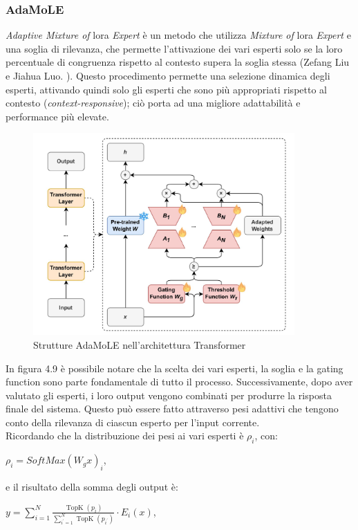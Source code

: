         \subsubsection{AdaMoLE}
        \textit{Adaptive Mixture of} \gls{lora} \textit{Expert} è un metodo che utilizza \textit{Mixture of} \gls{lora} \textit{Expert} e una soglia di rilevanza, che permette l’attivazione dei vari esperti solo se la loro percentuale di congruenza rispetto al contesto supera la soglia stessa (Zefang Liu e Jiahua Luo. \cite{article:Liu2024AdaMoLEFL}).
        Questo procedimento permette una selezione dinamica degli esperti, attivando quindi solo gli esperti che sono più appropriati rispetto al contesto (\textit{context-responsive}); ciò porta ad una migliore adattabilità e performance più elevate.
        \begin{figure}[htp]
            \centering        
            \includegraphics[width=10cm]{img/AdaMOle.pdf}
            \caption{Strutture AdaMoLE nell'architettura Transformer}
        \end{figure}\newline
        In figura 4.9 è possibile notare che la scelta dei vari esperti, la soglia e la gating function sono parte fondamentale di tutto il processo.
        Successivamente, dopo aver valutato gli esperti, i loro output vengono combinati per produrre la risposta finale del sistema. Questo può essere fatto attraverso pesi adattivi che tengono conto della rilevanza di ciascun esperto per l'input corrente.\\
        Ricordando che la distribuzione dei pesi ai vari esperti è $\rho_i$, con:\\
        \centerline{$\rho_i = SoftMax(W_gx)_i$,}
        e il risultato della somma degli output è:\\
        \centerline{$y=\sum_{i=1}^N \frac{\operatorname{TopK}\left(p_i\right)}{\sum_{i^{\prime}=1}^N \operatorname{TopK}\left(p_{i^{\prime}}\right)} \cdot E_i(x)$,}
